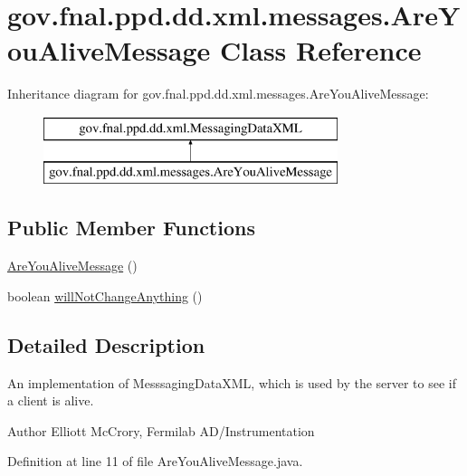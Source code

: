 \hypertarget{classgov_1_1fnal_1_1ppd_1_1dd_1_1xml_1_1messages_1_1AreYouAliveMessage}{\section{gov.\-fnal.\-ppd.\-dd.\-xml.\-messages.\-Are\-You\-Alive\-Message Class Reference}
\label{classgov_1_1fnal_1_1ppd_1_1dd_1_1xml_1_1messages_1_1AreYouAliveMessage}
}
Inheritance diagram for gov.\-fnal.\-ppd.\-dd.\-xml.\-messages.\-Are\-You\-Alive\-Message\-:\begin{figure}[H]
\begin{center}
\leavevmode
\includegraphics[height=2.000000cm]{classgov_1_1fnal_1_1ppd_1_1dd_1_1xml_1_1messages_1_1AreYouAliveMessage}
\end{center}
\end{figure}
\subsection*{Public Member Functions}
\begin{DoxyCompactItemize}
\item 
\hyperlink{classgov_1_1fnal_1_1ppd_1_1dd_1_1xml_1_1messages_1_1AreYouAliveMessage_a74585c4a5a8ebd614dac257659f1c05b}{Are\-You\-Alive\-Message} ()
\item 
boolean \hyperlink{classgov_1_1fnal_1_1ppd_1_1dd_1_1xml_1_1messages_1_1AreYouAliveMessage_ad0e98dae9fd49f343fc3d8448f6af7e1}{will\-Not\-Change\-Anything} ()
\end{DoxyCompactItemize}


\subsection{Detailed Description}
An implementation of Messsaging\-Data\-X\-M\-L, which is used by the server to see if a client is alive.

\begin{DoxyAuthor}{Author}
Elliott Mc\-Crory, Fermilab A\-D/\-Instrumentation 
\end{DoxyAuthor}


Definition at line 11 of file Are\-You\-Alive\-Message.\-java.



